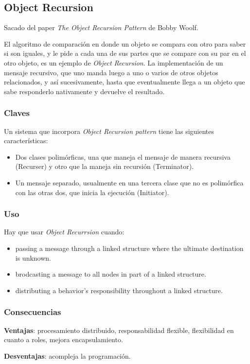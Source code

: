 \subsection{Object Recursion}

Sacado del paper \emph{The Object Recursion Pattern} de Bobby Woolf. 

El algoritmo de comparaci\'on en donde un objeto se compara con otro para saber si son iguales, y le pide a cada una de sus partes que se compare con su par en el otro objeto, es un ejemplo de \emph{Object Recursion}. La implementaci\'on de un mensaje recursivo, que uno manda luego a uno o varios de otros objetos relacionados, y as\'i sucesivamente, hasta que eventualmente llega a un objeto que sabe responderlo nativamente y devuelve el resultado. 

\subsubsection*{Claves}
Un sistema que incorpora \emph{Object Recursion pattern}  tiene las siguientes caracter\'isticas:

\begin{itemize}
 \item Dos clases polim\'orficas, una que maneja el mensaje de manera recursiva (Recurser) y otro que la maneja sin recursi\'on (Terminator). 
 \item Un mensaje separado, usualmente en una tercera clase que no es polim\'orfica con las otras dos, que inicia la ejecuci\'on (Initiator). 
\end{itemize}

\subsubsection*{Uso}
Hay que usar \emph{Object Recurrsion} cuando: 

\begin{itemize}
 \item passing a message through a linked structure where the ultimate destination is unknown. 
 \item brodcasting a message to all nodes in part of a linked structure. 
 \item distributing a behavior's responsibility throughout a linked structure. 
\end{itemize}

\subsubsection*{Consecuencias}

\textbf{Ventajas}: procesamiento distribuido, responsabilidad flexible, flexibilidad en cuanto a roles, mejora encapsulamiento. 

\textbf{Desventajas}: acompleja la programaci\'on. 